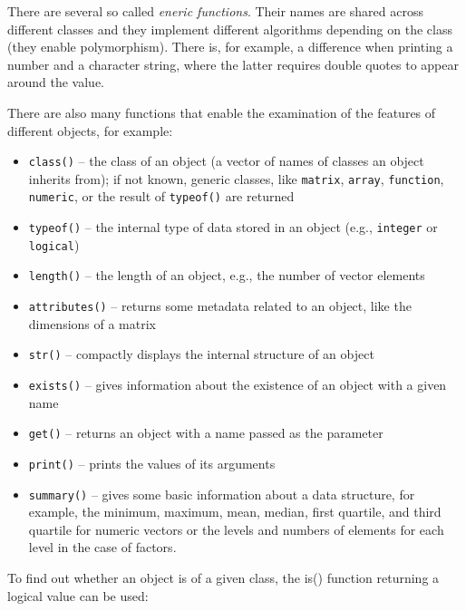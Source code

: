 There are several so called \textit{eneric functions}. Their names are shared across
different classes and they implement different algorithms depending on the class
(they enable polymorphism). There is, for example, a difference when printing a
number and a character string, where the latter requires double quotes to appear
around the value.

There are also many functions that enable the examination of the features of
different objects, for example:

\begin{itemize}
    \item \texttt{class()} – the class of an object (a vector of names of classes an object inherits from); if not known, generic classes, like \texttt{matrix}, \texttt{array},
\texttt{function}, \texttt{numeric}, or the result of \texttt{typeof()} are returned

    \item \texttt{typeof()} – the internal type of data stored in an object (e.g., \texttt{integer}
or \texttt{logical})

    \item \texttt{length()} – the length of an object, e.g., the number of vector elements
    
    \item \texttt{attributes()} – returns some metadata related to an object, like the
dimensions of a matrix

    \item \texttt{str()} – compactly displays the internal structure of an object
    
    \item \texttt{exists()} – gives information about the existence of an object with a
given name

    \item \texttt{get()} – returns an object with a name passed as the parameter
    \item \texttt{print()} – prints the values of its arguments

    \item \texttt{summary()} – gives some basic information about a data structure, for
example, the minimum, maximum, mean, median, first quartile, and third
quartile for numeric vectors or the levels and numbers of elements for
each level in the case of factors.
\end{itemize}

To find out whether an object is of a given class, the is() function returning
a logical value can be used:

